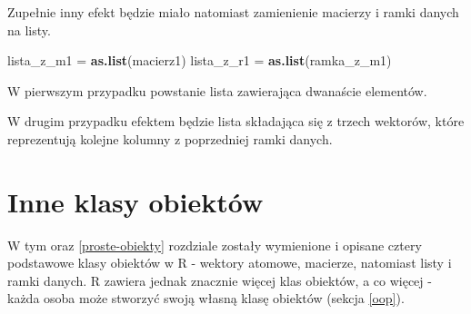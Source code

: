 \documentclass[paper=6in:9in,pagesize=pdftex,headinclude=on,footinclude=on,10pt]{scrbook}
\newenvironment{Shaded}{\begin{snugshade}}{\end{snugshade}}
\newcommand{\CommentTok}[1]{\textcolor[rgb]{0.56,0.35,0.01}{\textit{#1}}}
\newcommand{\KeywordTok}[1]{\textcolor[rgb]{0.13,0.29,0.53}{\textbf{#1}}}
\newcommand{\NormalTok}[1]{#1}
\newcommand{\StringTok}[1]{\textcolor[rgb]{0.31,0.60,0.02}{#1}}
\begin{document}
Zupełnie inny efekt będzie miało natomiast zamienienie macierzy i ramki danych na listy.

\begin{Shaded}
\begin{Highlighting}[]
\NormalTok{lista_z_m1 =}\StringTok{ }\KeywordTok{as.list}\NormalTok{(macierz1)}
\NormalTok{lista_z_r1 =}\StringTok{ }\KeywordTok{as.list}\NormalTok{(ramka_z_m1)}
\end{Highlighting}
\end{Shaded}

W pierwszym przypadku powstanie lista zawierająca dwanaście elementów.

\begin{Shaded}
\end{Shaded}

W drugim przypadku efektem będzie lista składająca się z trzech wektorów, które reprezentują kolejne kolumny z poprzedniej ramki danych.

\begin{Shaded}
\end{Shaded}

\hypertarget{inne-klasy}{%
\section{Inne klasy obiektów}\label{inne-klasy}}

W tym oraz \ref{proste-obiekty} rozdziale zostały wymienione i opisane cztery podstawowe klasy obiektów w R - wektory atomowe, macierze, natomiast listy i ramki danych.
R zawiera jednak znacznie więcej klas obiektów, a co więcej - każda osoba może stworzyć swoją własną klasę obiektów (sekcja \ref{oop}).
\end{document}
